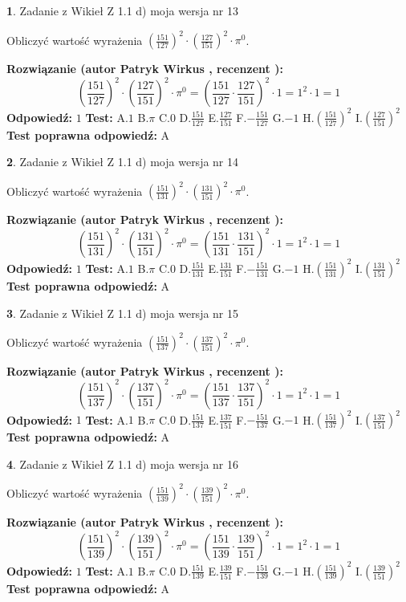 \documentclass[12pt, a4paper]{article}
\theoremstyle{definition} %
\newtheorem{zad}{}
\newcommand{\zadStart}[1]{\begin{zad}#1\newline}
\newcommand{\zadStop}{\end{zad}}
\newcommand{\rozwStart}[2]{\noindent \textbf{Rozwiązanie (autor #1 , recenzent #2): }\newline}
\newcommand{\rozwStop}{\newline}
\newcommand{\odpStart}{\noindent \textbf{Odpowiedź:}\newline}
\newcommand{\odpStop}{\newline}
\newcommand{\testStart}{\noindent \textbf{Test:}\newline}
\newcommand{\testStop}{\newline}
\newcommand{\kluczStart}{\noindent \textbf{Test poprawna odpowiedź:}\newline}
\newcommand{\kluczStop}{\newline}
\begin{document}
\zadStart{Zadanie z Wikieł Z 1.1 d) moja wersja nr 13}

Obliczyć wartość wyrażenia $(\frac{151}{127})^{2} \cdot (\frac{127}{151})^{2} \cdot \pi^{0}$.
\zadStop
\rozwStart{Patryk Wirkus}{}
$$(\frac{151}{127})^{2} \cdot (\frac{127}{151})^{2} \cdot \pi^{0} = (\frac{151}{127} \cdot \frac{127}{151})^{2} \cdot 1 = 1^{2} \cdot 1 = 1$$
\rozwStop
\odpStart
$1$
\odpStop
\testStart
A.$1$ B.$\pi$ C.$0$ D.$\frac{151}{127}$ E.$\frac{127}{151}$
F.$-\frac{151}{127}$ G.$-1$
H.$(\frac{151}{127})^{2}$
I.$(\frac{127}{151})^{2}$
\testStop
\kluczStart
A
\kluczStop



\zadStart{Zadanie z Wikieł Z 1.1 d) moja wersja nr 14}

Obliczyć wartość wyrażenia $(\frac{151}{131})^{2} \cdot (\frac{131}{151})^{2} \cdot \pi^{0}$.
\zadStop
\rozwStart{Patryk Wirkus}{}
$$(\frac{151}{131})^{2} \cdot (\frac{131}{151})^{2} \cdot \pi^{0} = (\frac{151}{131} \cdot \frac{131}{151})^{2} \cdot 1 = 1^{2} \cdot 1 = 1$$
\rozwStop
\odpStart
$1$
\odpStop
\testStart
A.$1$ B.$\pi$ C.$0$ D.$\frac{151}{131}$ E.$\frac{131}{151}$
F.$-\frac{151}{131}$ G.$-1$
H.$(\frac{151}{131})^{2}$
I.$(\frac{131}{151})^{2}$
\testStop
\kluczStart
A
\kluczStop



\zadStart{Zadanie z Wikieł Z 1.1 d) moja wersja nr 15}

Obliczyć wartość wyrażenia $(\frac{151}{137})^{2} \cdot (\frac{137}{151})^{2} \cdot \pi^{0}$.
\zadStop
\rozwStart{Patryk Wirkus}{}
$$(\frac{151}{137})^{2} \cdot (\frac{137}{151})^{2} \cdot \pi^{0} = (\frac{151}{137} \cdot \frac{137}{151})^{2} \cdot 1 = 1^{2} \cdot 1 = 1$$
\rozwStop
\odpStart
$1$
\odpStop
\testStart
A.$1$ B.$\pi$ C.$0$ D.$\frac{151}{137}$ E.$\frac{137}{151}$
F.$-\frac{151}{137}$ G.$-1$
H.$(\frac{151}{137})^{2}$
I.$(\frac{137}{151})^{2}$
\testStop
\kluczStart
A
\kluczStop



\zadStart{Zadanie z Wikieł Z 1.1 d) moja wersja nr 16}

Obliczyć wartość wyrażenia $(\frac{151}{139})^{2} \cdot (\frac{139}{151})^{2} \cdot \pi^{0}$.
\zadStop
\rozwStart{Patryk Wirkus}{}
$$(\frac{151}{139})^{2} \cdot (\frac{139}{151})^{2} \cdot \pi^{0} = (\frac{151}{139} \cdot \frac{139}{151})^{2} \cdot 1 = 1^{2} \cdot 1 = 1$$
\rozwStop
\odpStart
$1$
\odpStop
\testStart
A.$1$ B.$\pi$ C.$0$ D.$\frac{151}{139}$ E.$\frac{139}{151}$
F.$-\frac{151}{139}$ G.$-1$
H.$(\frac{151}{139})^{2}$
I.$(\frac{139}{151})^{2}$
\testStop
\kluczStart
A
\kluczStop
\end{document}
